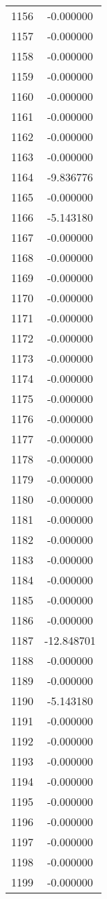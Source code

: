 \documentclass[12pt]{article}
\begin{document}
\begin{longtable}{@{}cc@{}}
1156 & -0.000000 \\
1157 & -0.000000 \\
1158 & -0.000000 \\
1159 & -0.000000 \\
1160 & -0.000000 \\
1161 & -0.000000 \\
1162 & -0.000000 \\
1163 & -0.000000 \\
1164 & -9.836776 \\
1165 & -0.000000 \\
1166 & -5.143180 \\
1167 & -0.000000 \\
1168 & -0.000000 \\
1169 & -0.000000 \\
1170 & -0.000000 \\
1171 & -0.000000 \\
1172 & -0.000000 \\
1173 & -0.000000 \\
1174 & -0.000000 \\
1175 & -0.000000 \\
1176 & -0.000000 \\
1177 & -0.000000 \\
1178 & -0.000000 \\
1179 & -0.000000 \\
1180 & -0.000000 \\
1181 & -0.000000 \\
1182 & -0.000000 \\
1183 & -0.000000 \\
1184 & -0.000000 \\
1185 & -0.000000 \\
1186 & -0.000000 \\
1187 & -12.848701 \\
1188 & -0.000000 \\
1189 & -0.000000 \\
1190 & -5.143180 \\
1191 & -0.000000 \\
1192 & -0.000000 \\
1193 & -0.000000 \\
1194 & -0.000000 \\
1195 & -0.000000 \\
1196 & -0.000000 \\
1197 & -0.000000 \\
1198 & -0.000000 \\
1199 & -0.000000 \\

\end{longtable}
\end{document}
